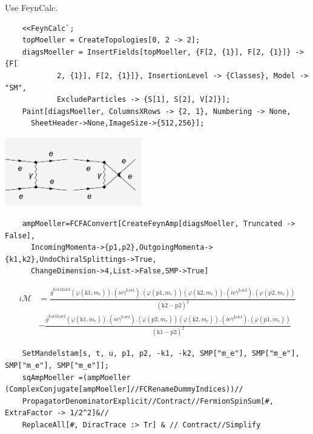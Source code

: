 \documentclass{article}
\begin{document}
\begin{enumerate}[\bf1.]
  Use FeynCalc.
  \begin{lstlisting}
    <<FeynCalc`;
    topMoeller = CreateTopologies[0, 2 -> 2];
    diagsMoeller = InsertFields[topMoeller, {F[2, {1}], F[2, {1}]} -> {F[
			2, {1}], F[2, {1}]}, InsertionLevel -> {Classes}, Model -> "SM",
			ExcludeParticles -> {S[1], S[2], V[2]}];
    Paint[diagsMoeller, ColumnsXRows -> {2, 1}, Numbering -> None,
      SheetHeader->None,ImageSize->{512,256}];
  \end{lstlisting}
  \includegraphics[height=3cm]{QEDMoellerScatteringTree.pdf}
  \begin{lstlisting}
    ampMoeller=FCFAConvert[CreateFeynAmp[diagsMoeller, Truncated -> False],
      IncomingMomenta->{p1,p2},OutgoingMomenta->{k1,k2},UndoChiralSplittings->True,
      ChangeDimension->4,List->False,SMP->True]
  \end{lstlisting}
  \begin{align*}
    i\mathcal{M}&=\frac{\bar{g}^{\text{Lor1}\text{Lor2}} \left(\varphi (\overline{\text{k1}},m_e)\right).\left(i
   \text{e} \bar{\gamma }^{\text{Lor1}}\right).\left(\varphi (\overline{\text{p1}},m_e)\right)
   \left(\varphi (\overline{\text{k2}},m_e)\right).\left(i \text{e} \bar{\gamma
   }^{\text{Lor2}}\right).\left(\varphi
   (\overline{\text{p2}},m_e)\right)}{\left(\overline{\text{k2}}-\overline{\text{p2}}\right)^2
   }\\&-\frac{\bar{g}^{\text{Lor1}\text{Lor2}} \left(\varphi
   (\overline{\text{k1}},m_e)\right).\left(i \text{e} \bar{\gamma
   }^{\text{Lor2}}\right).\left(\varphi (\overline{\text{p2}},m_e)\right) \left(\varphi
   (\overline{\text{k2}},m_e)\right).\left(i \text{e} \bar{\gamma
   }^{\text{Lor1}}\right).\left(\varphi
   (\overline{\text{p1}},m_e)\right)}{\left(\overline{\text{k1}}-\overline{\text{p2}}\right)^2
   }
  \end{align*}
  \begin{lstlisting}
    SetMandelstam[s, t, u, p1, p2, -k1, -k2, SMP["m_e"], SMP["m_e"], SMP["m_e"], SMP["m_e"]];
    sqAmpMoeller =(ampMoeller (ComplexConjugate[ampMoeller]//FCRenameDummyIndices))//
	PropagatorDenominatorExplicit//Contract//FermionSpinSum[#, ExtraFactor -> 1/2^2]&//
	ReplaceAll[#, DiracTrace :> Tr] & // Contract//Simplify

\end{lstlisting}
\end{enumerate}
\end{document}
